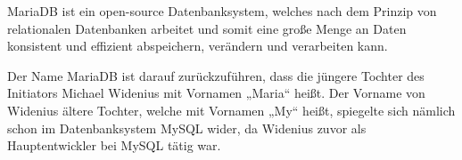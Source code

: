 
MariaDB ist ein open-source Datenbanksystem, welches nach dem Prinzip von relationalen Datenbanken arbeitet und somit eine große Menge an Daten konsistent und effizient abspeichern, verändern und verarbeiten kann.

Der Name MariaDB ist darauf zurückzuführen, dass die jüngere Tochter des Initiators Michael Widenius mit Vornamen „Maria“ heißt. Der Vorname von Widenius ältere Tochter, welche mit Vornamen „My“ heißt, spiegelte sich nämlich schon im Datenbanksystem MySQL wider, da Widenius zuvor als Hauptentwickler bei MySQL tätig war. \cite{MariaWiki}
